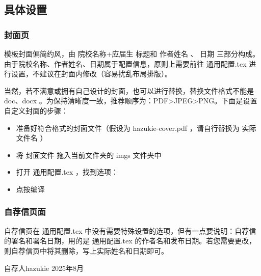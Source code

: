 \documentclass[a4paper,12pt]{ctexart}
\newenvironment{pul}[1]{
	\begin{itemize}[topsep=0pt,labelsep=.5em,leftmargin=\the\dimexpr 0.5em+ #1\relax,itemsep=0em,parsep=.5em]
	}{\end{itemize}}
\newcommand{\emp}[1]{
	\colorbox{spanbg}{#1}
}
\begin{document}
	\subsection{具体设置}
	\subsubsection{封面页}
	模板封面偏简约风，由\emp{院校名称+应届生}标题和\emp{作者姓名}、\emp{日期}三部分构成。由于院校名称、作者姓名、日期属于配置信息，原则上需要前往\emp{通用配置.tex}进行设置，不建议在封面内修改（容易扰乱布局排版）。
	\begin{latexcode}
	\def\theUniversityName{大学名}  %
	\def\theCollegeName{学院名}  %
	\def\theSession{xxxx届}  %
	\def\theAuthorName{你的姓名}  %
	\def\theReleaseDate{发布日期} %
	\end{latexcode}
	
	当然，若不满意或拥有自己设计的封面，也可以进行替换，替换文件格式不能是\emp{doc、docx}。为保持清晰度一致，推荐顺序为：PDF>JPEG>PNG。下面是设置自定义封面的步骤：
	\begin{pul}{2em}
	\item 准备好符合格式的封面文件（假设为\emp{hazukie-cover.pdf}，请自行替换为\emp{实际文件名}）
	\item  将\emp{封面文件}拖入当前文件夹的\emp{imgs}文件夹中
	\item 打开\emp{通用配置.tex}，找到选项：
		\begin{latexcode}
	\def\theCoverPageNeed{true} %
	\def\theCoverPageCustomNeed{true}  
	\def\theCoverPageCustomPath{imgs/hazukie-cover.pdf}  
	\def\theCoverPageCustomScale{1} %
	
		\end{latexcode}
	\item 点按编译
	\end{pul}
	\subsubsection{自荐信页面}
	自荐信页在\emp{通用配置.tex}中没有需要特殊设置的选项，但有一点要说明：自荐信的署名和署名日期，用的是\emp{通用配置.tex}的作者名和发布日期。若您需要更改，则自荐信页中将其删除，写上实际姓名和日期即可。
	\begin{latexcode}
	\begin{flushright}
		自荐人\quad hazukie
		2025年8月
	\end{flushright}
	\end{latexcode}
	
\end{document}
